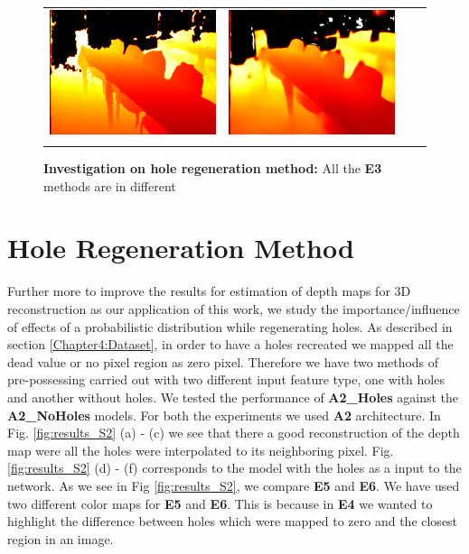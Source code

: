 \begin{figure}
\begin{tabular}{@{}c@{ }c@{ }c@{ }c@{}}
\includegraphics[width=.3\linewidth]{Figures/results/s3_noNyu/2Truth.png}&
\includegraphics[width=.3\linewidth]{Figures/results/s3_noNyu/2Predicted.png}\\[-1ex]
&\mycaption{} & \mycaption{} & \mycaption{} \\
\end{tabular}
\caption{\textbf{Investigation on hole regeneration method:} All the \textbf{E3} methods are in different  }%
\label{figure1}
\end{figure}









 \section{Hole Regeneration Method}
 \label{Chapter6:Hole_Regeneration}
Further more to improve the results for estimation of depth maps for 3D reconstruction as our application of this work, we study the importance/influence of effects of a probabilistic distribution while regenerating holes. As described in section \ref{Chapter4:Dataset}, in order to have a holes recreated we mapped all the dead value or no pixel region as zero pixel. Therefore we have two methods of pre-possessing carried out with two different input feature type, one with holes and another without holes. We tested the performance of \textbf{A2\_Holes} against the \textbf{A2\_NoHoles} models. For both the experiments we used \textbf{A2} architecture.  In Fig. \ref{fig:results_S2} (a) - (c) we see that there a good reconstruction of the depth map were all the holes were interpolated to its neighboring pixel.  Fig. \ref{fig:results_S2} (d) - (f)  corresponds to the model with the holes as a input to the network. As we see in Fig \ref{fig:results_S2}, we compare \textbf{E5} and \textbf{E6}. We have used two different color maps for \textbf{E5} and \textbf{E6}. This is because in \textbf{E4} we wanted to highlight the difference between holes which were mapped to zero and the closest region in an image. 

